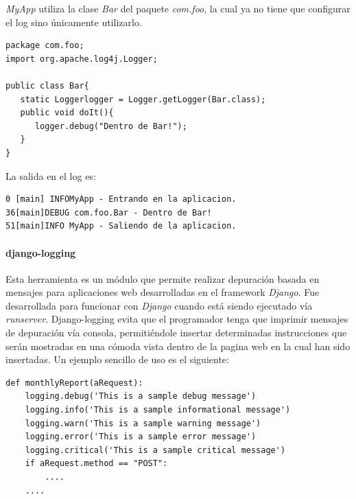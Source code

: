 \documentclass[12pt,legalpaper]{report}
\begin{document}
\textit{MyApp} utiliza la clase \textit{Bar} del paquete \textit{com.foo}, la cual ya no tiene que configurar el log sino únicamente utilizarlo.

\begin{singlespace}
\begin{lstlisting}
package com.foo;
import org.apache.log4j.Logger;

public class Bar{
   static Loggerlogger = Logger.getLogger(Bar.class);
   public void doIt(){
      logger.debug("Dentro de Bar!");
   }
}
\end{lstlisting}
\end{singlespace}
	
La salida en el log es:

\begin{singlespace}
\begin{lstlisting}[style=consola,numbers=none]
0 [main] INFOMyApp - Entrando en la aplicacion.
36[main]DEBUG com.foo.Bar - Dentro de Bar!
51[main]INFO MyApp - Saliendo de la aplicacion.	
\end{lstlisting}
\end{singlespace}
				\paragraph{django-logging}
				
Esta herramienta \cite{django-logging} es un módulo que permite realizar depuración basada en mensajes para aplicaciones web desarrolladas en el framework \textit{Django}. Fue desarrollada para funcionar con \textit{Django} cuando está siendo ejecutado vía \textit{runserver}.  Django-logging evita que el programador tenga que imprimir mensajes de depuración vía consola, permitiéndole insertar determinadas instrucciones que serán mostradas en una cómoda vista dentro de la pagina web en la cual han sido insertadas.  						
Un ejemplo sencillo de uso es el siguiente:

\begin{singlespace}
\begin{lstlisting}[style=Python]
def monthlyReport(aRequest):
    logging.debug('This is a sample debug message')
    logging.info('This is a sample informational message')
    logging.warn('This is a sample warning message')
    logging.error('This is a sample error message')
    logging.critical('This is a sample critical message')    
    if aRequest.method == "POST":
    	....
    ....
\end{lstlisting}
\end{singlespace}
\end{document}
